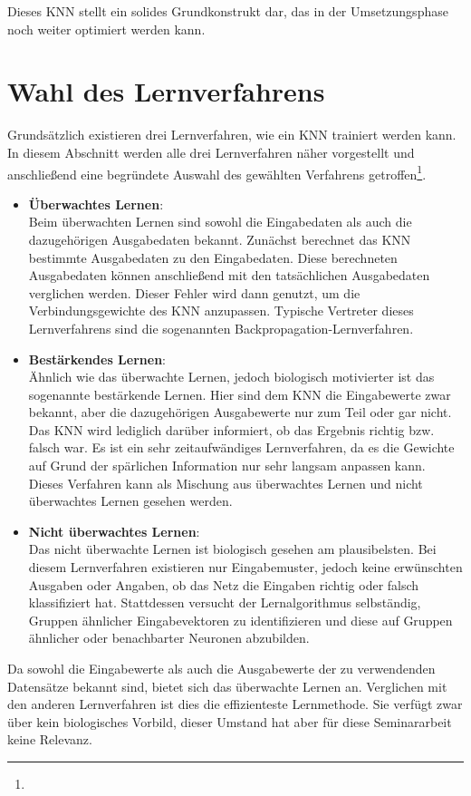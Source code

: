 Dieses KNN stellt ein solides Grundkonstrukt dar, das in der Umsetzungsphase noch weiter optimiert werden kann.

\section{Wahl des Lernverfahrens} 
\label{section:Wahl des Lernverfahrens}

Grundsätzlich existieren drei Lernverfahren, wie ein KNN trainiert werden kann. In diesem Abschnitt werden alle drei Lernverfahren näher vorgestellt und anschließend eine begründete Auswahl des gewählten Verfahrens getroffen\footnote{\Vgl{}}.

\begin{itemize}
\item \textbf{Überwachtes Lernen}: \\
Beim überwachten Lernen sind sowohl die Eingabedaten als auch die dazugehörigen Ausgabedaten bekannt. Zunächst berechnet das KNN bestimmte Ausgabedaten zu den Eingabedaten. Diese berechneten Ausgabedaten können anschließend mit den tatsächlichen Ausgabedaten verglichen werden. Dieser Fehler wird dann genutzt, um die Verbindungsgewichte des KNN anzupassen. Typische Vertreter dieses Lernverfahrens sind die sogenannten Backpropagation-Lernverfahren.
	
\item \textbf{Bestärkendes Lernen}: \\
Ähnlich wie das überwachte Lernen, jedoch biologisch motivierter ist das sogenannte bestärkende Lernen. Hier sind dem KNN die Eingabewerte zwar bekannt, aber die dazugehörigen Ausgabewerte nur zum Teil oder gar nicht. Das KNN wird lediglich darüber informiert, ob das Ergebnis richtig bzw. falsch war. Es ist ein sehr zeitaufwändiges Lernverfahren, da es die Gewichte auf Grund der spärlichen Information nur sehr langsam anpassen kann. Dieses Verfahren kann als Mischung aus überwachtes Lernen und nicht überwachtes Lernen gesehen werden.

\item \textbf{Nicht überwachtes Lernen}: \\
Das nicht überwachte Lernen ist biologisch gesehen am plausibelsten. Bei diesem  Lernverfahren existieren nur Eingabemuster, jedoch keine erwünschten Ausgaben oder Angaben, ob das Netz die Eingaben richtig oder falsch klassifiziert hat. Stattdessen versucht der Lernalgorithmus selbständig, Gruppen ähnlicher Eingabevektoren zu identifizieren und diese auf Gruppen ähnlicher oder benachbarter Neuronen abzubilden. 
\end{itemize}

Da sowohl die Eingabewerte als auch die Ausgabewerte der zu verwendenden Datensätze bekannt sind, bietet sich das überwachte Lernen an. Verglichen mit den anderen Lernverfahren ist dies die effizienteste Lernmethode. Sie verfügt zwar über kein biologisches Vorbild, dieser Umstand hat aber für diese Seminararbeit keine Relevanz.
